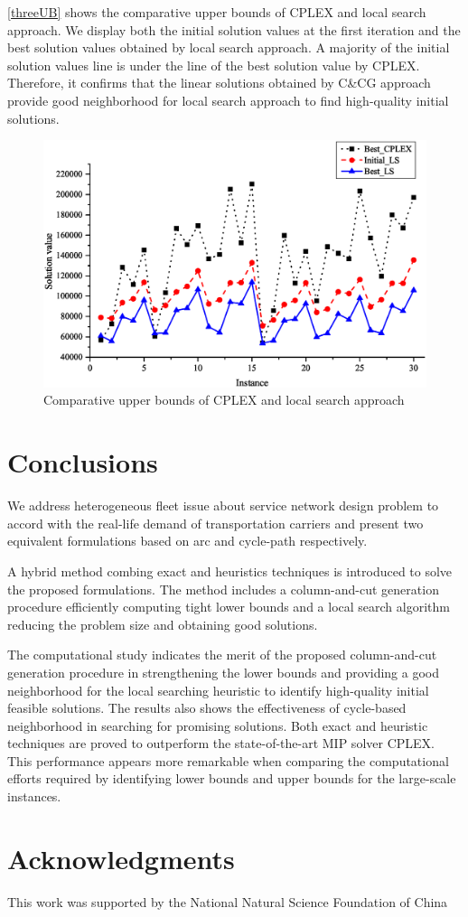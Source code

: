 \documentclass[11pt,nonblindrev,fleqn]{article}
\begin{document}
\autoref{threeUB} shows the comparative upper bounds of CPLEX and local search approach. We display both the initial solution values at the first iteration and the best solution values obtained by local search approach. A majority of the initial solution values line is under the line of the best solution value by CPLEX. Therefore, it confirms that the linear solutions obtained by C\&CG approach provide good neighborhood for local search approach to find high-quality initial solutions.

\begin{figure}[H]
\setlength{\abovecaptionskip}{-5pt}
\setlength{\belowcaptionskip}{-5pt}
\centering
\includegraphics[width=0.9\linewidth]{F5.eps}
\caption{Comparative upper bounds of CPLEX and local search approach}
\label{threeUB}
\end{figure}



\section{Conclusions}\label{conclusion}
We address heterogeneous fleet issue about service network design problem to accord with the real-life demand of transportation carriers and present two equivalent formulations based on arc and cycle-path respectively.

A hybrid method combing exact and heuristics techniques is introduced to solve the proposed formulations. The method includes a column-and-cut generation procedure efficiently computing tight lower bounds and a local search algorithm reducing the problem size and obtaining good solutions.

The computational study indicates the merit of the proposed column-and-cut generation procedure in strengthening the lower bounds and providing a good neighborhood for the local searching heuristic to identify high-quality initial feasible solutions. The results also shows the effectiveness of cycle-based neighborhood in searching for promising solutions. Both exact and heuristic techniques are proved to outperform the state-of-the-art MIP solver CPLEX. This performance appears more remarkable when comparing the computational efforts required by identifying lower bounds and upper bounds for the large-scale instances.
\section*{Acknowledgments}

This work was supported by the National Natural Science Foundation of China
\end{document}
